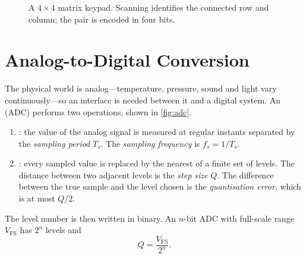 \begin{figure}[htbp]
\centering
{}
\caption{A $4\times4$ matrix keypad. Scanning identifies the connected row and column; the pair is encoded in four bits.}
\label{fig:keypad}
\end{figure}

\section{Analog-to-Digital Conversion}\label{sec:adc}
The physical world is analog---temperature, pressure, sound and light vary continuously---so an interface is needed between it and a digital system. An  (ADC) performs two operations, shown in \cref{fig:adc}.
\begin{enumerate}
  \item {}: the value of the analog signal is measured at regular instants separated by the \emph{sampling period} $T_s$. The \emph{sampling frequency} is $f_s = 1/T_s$.
  \item {}: every sampled value is replaced by the nearest of a finite set of levels. The distance between two adjacent levels is the \emph{step size} $Q$. The difference between the true sample and the level chosen is the \emph{quantisation error}, which is at most $Q/2$.
\end{enumerate}
The level number is then written in binary. An $n$-bit ADC with full-scale range $V_{\mathrm{FS}}$ has $2^n$ levels and
\begin{equation}
  Q = \frac{V_{\mathrm{FS}}}{2^n}.
  \label{eq:adc-step}
\end{equation}

